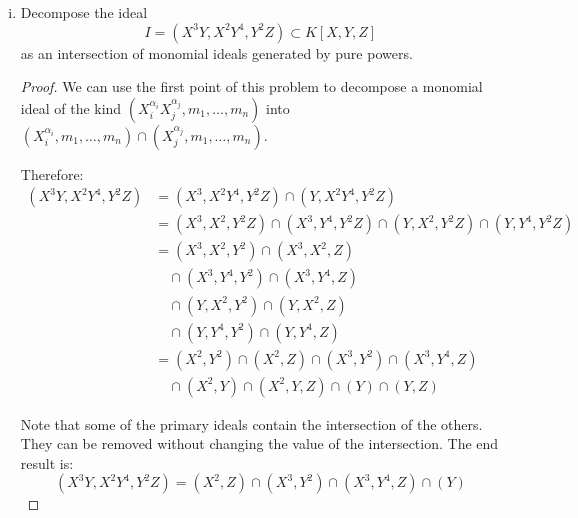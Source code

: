 \begin{problem*}{7}
\begin{enumerate}[(i)]
\begin{proof}
    We will prove the converse by contradiction. Suppose \(I = J_1 \cap J_2\) and that \(I \subsetneq J_1\), \(I \subsetneq J_2\). From exercise 8 from the previous homework, we know that \(J_1 \cap J_2 = \left(\lcm(u, v) \mid u \in G(J_1), v \in G(J_2)\right)\). Since the inclusions are strict, we can take \(m_1 \in G(J_1) \setminus G(I)\), \(m_2 \in G(J_2) \setminus G(I)\). Then \(\lcm(m_1, m_2) \in J_1 \cap J_2 = I\), so there exists a pure power \(X_i^{\alpha_i} \in G(I)\) which divides \(\lcm(m_1, m_2)\). But then \(X_i^{\alpha_i} \divides m_1\) or \(X_i^{\alpha_i} \divides m_2\), contradiction.
    \end{proof}
    
    \item Decompose the ideal
    \[
        I = (X^3 Y, X^2 Y^4, Y^2 Z) \subset K[X, Y, Z]
    \]
    as an intersection of monomial ideals generated by pure powers.
    \begin{proof}
    We can use the first point of this problem to decompose a monomial ideal of the kind \((X_i^{\alpha_i} X_j^{\alpha_j}, m_1, \dots, m_n)\) into \((X_i^{\alpha_i}, m_1, \dots, m_n) \cap (X_j^{\alpha_j}, m_1, \dots, m_n)\).
    
    Therefore:
    \begin{align*}
        (X^3 Y, X^2 Y^4, Y^2 Z) &= (X^3, X^2 Y^4, Y^2 Z) \cap (Y, X^2 Y^4, Y^2 Z) \\
        &= (X^3, X^2, Y^2 Z) \cap (X^3, Y^4, Y^2 Z) \cap (Y, X^2, Y^2 Z) \cap (Y, Y^4, Y^2 Z) \\
        &= (X^3, X^2, Y^2) \cap (X^3, X^2, Z) \\
        &\quad \cap (X^3, Y^4, Y^2) \cap (X^3, Y^4, Z) \\
        &\quad \cap (Y, X^2, Y^2) \cap (Y, X^2, Z) \\
        &\quad \cap (Y, Y^4, Y^2) \cap (Y, Y^4, Z) \\
        &= (X^2, Y^2) \cap (X^2, Z) \cap (X^3, Y^2) \cap (X^3, Y^4, Z) \\
        &\quad \cap (X^2, Y) \cap (X^2, Y, Z) \cap (Y) \cap (Y, Z)
    \end{align*}
    
    Note that some of the primary ideals contain the intersection of the others. They can be removed without changing the value of the intersection. The end result is:
    \[
        (X^3 Y, X^2 Y^4, Y^2 Z) = (X^2, Z) \cap (X^3, Y^2) \cap (X^3, Y^4, Z) \cap (Y)
    \]
    \end{proof}
\end{enumerate}
\end{problem*}
